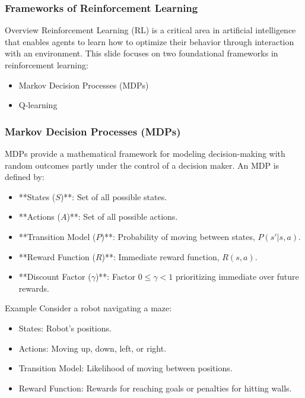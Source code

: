 \documentclass[aspectratio=169]{beamer}
\begin{document}
\begin{frame}[fragile]
    \frametitle{Frameworks of Reinforcement Learning}
    \begin{block}{Overview}
        Reinforcement Learning (RL) is a critical area in artificial intelligence that enables agents to learn how to optimize their behavior through interaction with an environment. This slide focuses on two foundational frameworks in reinforcement learning: 
        \begin{itemize}
            \item Markov Decision Processes (MDPs)
            \item Q-learning
        \end{itemize}
    \end{block}
\end{frame}

\begin{frame}[fragile]
    \frametitle{Markov Decision Processes (MDPs)}
    \begin{definition}
        MDPs provide a mathematical framework for modeling decision-making with random outcomes partly under the control of a decision maker. An MDP is defined by:
    \end{definition}
    \begin{itemize}
        \item **States ($S$)**: Set of all possible states.
        \item **Actions ($A$)**: Set of all possible actions.
        \item **Transition Model ($P$)**: Probability of moving between states, \(P(s'|s,a)\).
        \item **Reward Function ($R$)**: Immediate reward function, \(R(s,a)\).
        \item **Discount Factor ($\gamma$)**: Factor \(0 \leq \gamma < 1\) prioritizing immediate over future rewards.
    \end{itemize}
    \begin{block}{Example}
        Consider a robot navigating a maze:
        \begin{itemize}
            \item States: Robot's positions.
            \item Actions: Moving up, down, left, or right.
            \item Transition Model: Likelihood of moving between positions.
            \item Reward Function: Rewards for reaching goals or penalties for hitting walls.
        \end{itemize}
    \end{block}
\end{frame}
\end{document}
